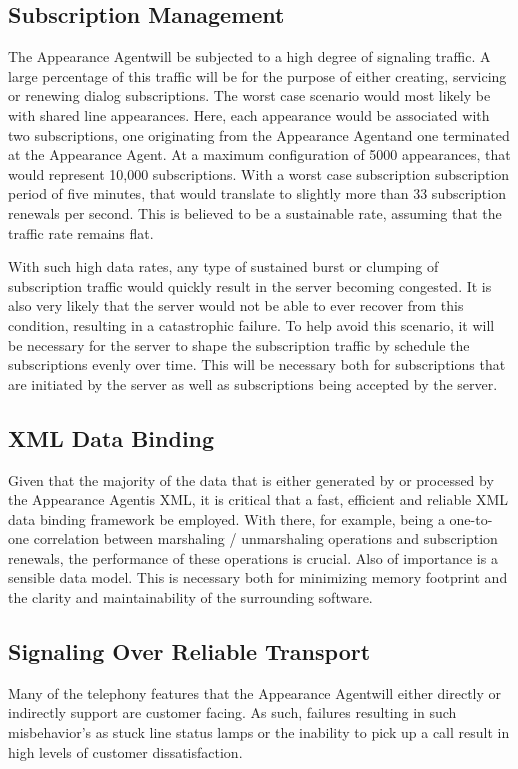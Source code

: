 \documentclass[twoside,11pt]{article}
\newcommand{\PAA}{Appearance Agent\space}
\begin{document}
\subsection{Subscription Management}
  The \PAA will be subjected to a high degree of signaling traffic.  A large
  percentage of this traffic will be for the purpose of either creating,
  servicing or renewing dialog subscriptions.  The worst case scenario would
  most likely be with shared line appearances.  Here, each appearance would
  be associated with two subscriptions, one originating from the \PAA and one
  terminated at the \PAA.  At a maximum configuration of 5000 appearances, that
  would represent 10,000 subscriptions.  With a worst case subscription
  subscription period of five minutes, that would translate to slightly more
  than 33 subscription renewals per second.  This is believed to be a sustainable rate,
  assuming that the traffic rate remains flat.

  With such high data rates, any type of sustained burst or clumping of subscription traffic would
  quickly result in the server becoming congested. It is also very likely that the server would not
  be able to ever recover from this condition, resulting in a catastrophic failure.  To help avoid
  this scenario, it will be necessary for the server to shape the subscription traffic by schedule
  the subscriptions evenly over time.  This will be necessary both for subscriptions that are
  initiated by the server as well as subscriptions being accepted by the server.
  
\subsection{XML Data Binding}
  Given that the majority of the data that is either generated by or processed by the \PAA is XML,
  it is critical that a fast, efficient and reliable XML data binding framework be employed.  With
  there, for example, being a one-to-one correlation between marshaling / unmarshaling operations
  and subscription renewals, the performance of these operations is crucial. Also of importance is a
  sensible data model. This is necessary both for minimizing memory footprint and the clarity and
  maintainability of the surrounding software.
  
\subsection{Signaling Over Reliable Transport}
  Many of the telephony features that the \PAA will either directly or indirectly support are
  customer facing.  As such, failures resulting in such misbehavior's as stuck line status lamps or
  the inability to pick up a call result in high levels of customer dissatisfaction.
  
\end{document}
